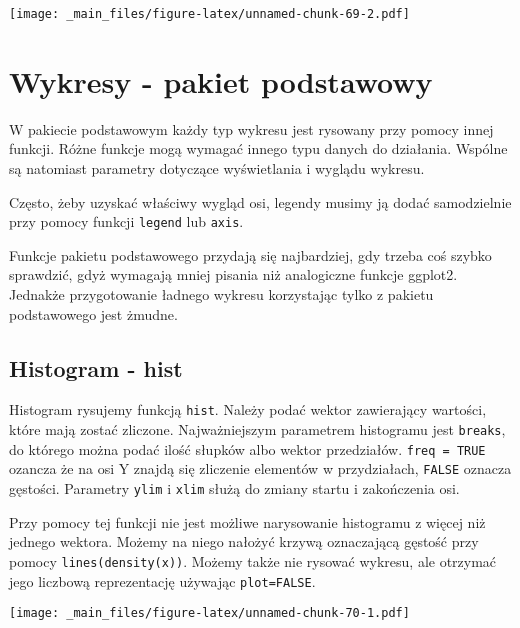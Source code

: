 \documentclass[
]{book}
\newenvironment{Shaded}{\begin{snugshade}}{\end{snugshade}}
\newcommand{\FunctionTok}[1]{\textcolor[rgb]{0.00,0.00,0.00}{#1}}
\newcommand{\NormalTok}[1]{#1}
\newcommand{\SpecialCharTok}[1]{\textcolor[rgb]{0.00,0.00,0.00}{#1}}
\begin{document}
\texttt{[image: \_main\_files/figure-latex/unnamed-chunk-69-2.pdf]}

\hypertarget{wykresy---pakiet-podstawowy}{%
\chapter{Wykresy - pakiet podstawowy}\label{wykresy---pakiet-podstawowy}}

W pakiecie podstawowym każdy typ wykresu jest rysowany przy pomocy innej funkcji. Różne funkcje mogą wymagać innego typu danych do działania. Wspólne są natomiast parametry dotyczące wyświetlania i wyglądu wykresu.

Często, żeby uzyskać właściwy wygląd osi, legendy musimy ją dodać samodzielnie przy pomocy funkcji \texttt{legend} lub \texttt{axis}.

Funkcje pakietu podstawowego przydają się najbardziej, gdy trzeba coś szybko sprawdzić, gdyż wymagają mniej pisania niż analogiczne funkcje ggplot2. Jednakże przygotowanie ładnego wykresu korzystając tylko z pakietu podstawowego jest żmudne.

\hypertarget{histogram---hist}{%
\section{Histogram - hist}\label{histogram---hist}}

Histogram rysujemy funkcją \texttt{hist}. Należy podać wektor zawierający wartości, które mają zostać zliczone. Najważniejszym parametrem histogramu jest \texttt{breaks}, do którego można podać ilość słupków albo wektor przedziałów. \texttt{freq\ =\ TRUE} ozancza że na osi Y znajdą się zliczenie elementów w przydziałach, \texttt{FALSE} oznacza gęstości. Parametry \texttt{ylim} i \texttt{xlim} służą do zmiany startu i zakończenia osi.

Przy pomocy tej funkcji nie jest możliwe narysowanie histogramu z więcej niż jednego wektora. Możemy na niego nałożyć krzywą oznaczającą gęstość przy pomocy \texttt{lines(density(x))}. Możemy także nie rysować wykresu, ale otrzymać jego liczbową reprezentację używając \texttt{plot=FALSE}.

\begin{Shaded}
\end{Shaded}

\texttt{[image: \_main\_files/figure-latex/unnamed-chunk-70-1.pdf]}
\end{document}
